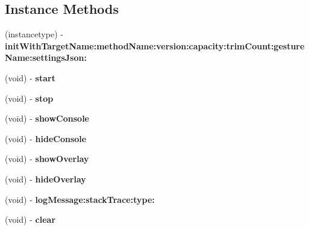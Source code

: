 \subsection*{Instance Methods}
\begin{DoxyCompactItemize}
\item 
\mbox{\label{interface_l_u_console_plugin_a2f8f0c92f93292bb2d89f539fd39c65f}} 
(instancetype) -\/ {\bfseries init\+With\+Target\+Name\+:method\+Name\+:version\+:capacity\+:trim\+Count\+:gesture\+Name\+:settings\+Json\+:}
\item 
\mbox{\label{interface_l_u_console_plugin_a02b1ebf7305e40974556fadb142ad532}} 
(void) -\/ {\bfseries start}
\item 
\mbox{\label{interface_l_u_console_plugin_a2efaac0fc5422b87c099eb1172b3fe56}} 
(void) -\/ {\bfseries stop}
\item 
\mbox{\label{interface_l_u_console_plugin_a3caaf8c0adcd97eade8050b20aeb9310}} 
(void) -\/ {\bfseries show\+Console}
\item 
\mbox{\label{interface_l_u_console_plugin_a07d940a1661a805eb0e3a48c685a9414}} 
(void) -\/ {\bfseries hide\+Console}
\item 
\mbox{\label{interface_l_u_console_plugin_a2dbc8759e9cd9d8270a264529442f340}} 
(void) -\/ {\bfseries show\+Overlay}
\item 
\mbox{\label{interface_l_u_console_plugin_aee36969185d533552fc8b038fe1eec94}} 
(void) -\/ {\bfseries hide\+Overlay}
\item 
\mbox{\label{interface_l_u_console_plugin_ac7ebb11cd90ce3894291173d16c89066}} 
(void) -\/ {\bfseries log\+Message\+:stack\+Trace\+:type\+:}
\item 
\mbox{\label{interface_l_u_console_plugin_a045399891eb9f556a0909c64a41bb9db}} 
(void) -\/ {\bfseries clear}
\item 
\mbox{\label{interface_l_u_console_plugin_ae21c651559ce95764a7bfabd0fb73ff0}} 

\end{DoxyCompactItemize}
